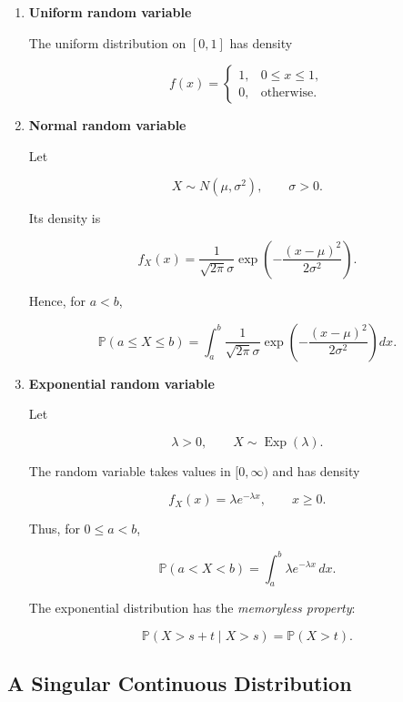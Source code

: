\begin{enumerate}

    \item \textbf{Uniform random variable}

    The uniform distribution on $[0,1]$ has density

    \[
    f(x)
    =
    \begin{cases}
        1, & 0\leq x\leq1,\\
        0, & \text{otherwise}.
    \end{cases}
    \]

    \item \textbf{Normal random variable}

    Let

    \[
    X\sim N(\mu,\sigma^2),
    \qquad
    \sigma>0.
    \]

    Its density is

    \[
    f_X(x)
    =
    \frac{1}{\sqrt{2\pi}\sigma}
    \exp\left(
        -\frac{(x-\mu)^2}{2\sigma^2}
    \right).
    \]

    Hence, for $a<b$,

    \[
    \mathbb{P}(a\leq X\leq b)
    =
    \int_a^b
    \frac{1}{\sqrt{2\pi}\sigma}
    \exp\left(
        -\frac{(x-\mu)^2}{2\sigma^2}
    \right)
    dx.
    \]

    \item \textbf{Exponential random variable}

    Let

    \[
    \lambda>0,
    \qquad
    X\sim\operatorname{Exp}(\lambda).
    \]

    The random variable takes values in $[0,\infty)$ and has density

    \[
    f_X(x)
    =
    \lambda e^{-\lambda x},
    \qquad
    x\geq0.
    \]

    Thus, for $0\leq a<b$,

    \[
    \mathbb{P}(a<X<b)
    =
    \int_a^b
    \lambda e^{-\lambda x}\,dx.
    \]

    The exponential distribution has the \emph{memoryless property}:

    \[
    \mathbb{P}(X>s+t\mid X>s)
    =
    \mathbb{P}(X>t).
    \]

\end{enumerate}

\subsection{A Singular Continuous Distribution}

